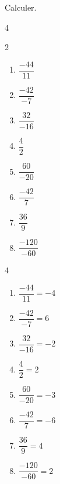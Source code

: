 \begin{exercice*}
    Calculer.
    \begin{multicols}4
      \begin{spacing}2
        \begin{enumerate}
          \item $\dfrac{-44}{11}$
          \item $\dfrac{-42}{-7}$
          \item $\dfrac{32}{-16}$
          \item $\dfrac{4}{2}$
          \item $\dfrac{60}{-20}$
          \item $\dfrac{-42}{7}$
          \item $\dfrac{36}{9}$
          \item $\dfrac{-120}{-60}$
        \end{enumerate}
      \end{spacing}
    \end{multicols}

\end{exercice*}
\begin{corrige}
    \phantom{rrr}
    \begin{multicols}4
      \begin{spacing}{2}
        \begin{enumerate}
          \item $\dfrac{-44}{11}=-4$
          \item $\dfrac{-42}{-7}=6$
          \item $\dfrac{32}{-16}=-2$
          \item $\dfrac{4}{2}=2$
          \item $\dfrac{60}{-20}=-3$
          \item $\dfrac{-42}{7}=-6$
          \item $\dfrac{36}{9}=4$
          \item $\dfrac{-120}{-60}=2$
        \end{enumerate}
      \end{spacing}
    \end{multicols}
\end{corrige}

